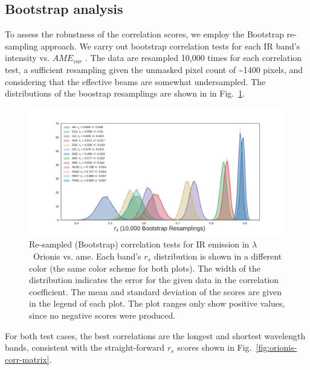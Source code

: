     \subsection{Bootstrap analysis}
        To assess the robustness of the correlation scores, we employ the Bootstrap re-sampling approach. We carry out bootstrap correlation tests for each IR band's intensity vs. $AME_{var}$ . The data are resampled 10,000 times for each correlation test, a sufficient resampling given the unmasked pixel count of \textasciitilde{}1400 pixels, and considering that the effective beams are somewhat undersampled.  The distributions of the boostrap resamplings are shown in in Fig.~\ref{fig:bootstrap_vs_AME}.
            \begin{figure}
              \includegraphics[width=\textwidth,trim={3cm 0.25cm 2.5cm 1cm},clip]{../Plots/ch_lori/bootstrap_vs_AME_spearman_i10000.pdf}
              \centering
              \caption{Re-sampled (Bootstrap) correlation tests for IR emission in $\lambda$~Orionis vs. \gls{ame}. Each band's $r_{s}$ distribution is shown in a different color (the same color scheme for both plots). The width of the distribution indicates the error for the given data in the correlation coefficient. The mean and standard deviation of the scores are given in the legend of each plot. The plot ranges only show positive values, since no negative scores were produced. }
              \label{fig:bootstrap_vs_AME}
            \end{figure}
        For both test cases, the best correlations are the longest and shortest wavelength bands, consistent with the straight-forward $r_{s}$ scores shown in Fig.~\ref{fig:orionis-corr-matrix}.


